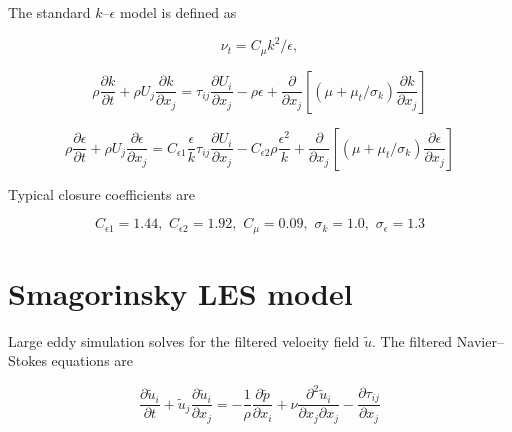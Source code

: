 The standard $k$--$\epsilon$ model is defined as \cite{Wilcox1993}

\begin{equation}
    \nu_t = C_\mu k^2 / \epsilon,
    \label{eq:kepsilon-nut}
\end{equation}

\begin{equation}
    \rho \frac{\partial k}{\partial t}
    + \rho U_j \frac{\partial k}{\partial x_j}
    = \tau_{ij} \frac{\partial U_i}{\partial x_j}
    - \rho \epsilon
    + \frac{\partial}{\partial x_j}
    \left[
    (\mu + \mu_t/\sigma_k) \frac{\partial k}{\partial x_j}
    \right]
    \label{eq:kepsilon-k}
\end{equation}

\begin{equation}
    \rho \frac{\partial \epsilon}{\partial t}
    + \rho U_j \frac{\partial \epsilon}{\partial x_j}
    = C_{\epsilon 1} \frac{\epsilon}{k} \tau_{ij}
    \frac{\partial U_i}{\partial x_j}
    - C_{\epsilon 2} \rho \frac{\epsilon^2}{k}
    + \frac{\partial}{\partial x_j}
    \left[
    (\mu + \mu_t/\sigma_k) \frac{\partial \epsilon}{\partial x_j}
    \right]
    \label{eq:kepsilon-epsilon}
\end{equation}

Typical closure coefficients are

\begin{equation}
    C_{\epsilon 1} = 1.44, \, \,
    C_{\epsilon 2} = 1.92, \, \,
    C_\mu = 0.09, \, \,
    \sigma_k = 1.0, \, \,
    \sigma_\epsilon = 1.3
\end{equation}


\section{Smagorinsky LES model}

Large eddy simulation solves for the filtered velocity field $\tilde{u}$. The
filtered Navier--Stokes equations are

\begin{equation}
    \frac{\partial \tilde{u}_i}{\partial t}
    + \tilde{u}_j \frac{\partial \tilde{u}_i}{\partial x_j}
    = - \frac{1}{\rho} \frac{\partial \tilde{p}}{\partial x_i}
    + \nu \frac{\partial^2 \tilde{u}_i}{\partial x_j \partial x_j}
    - \frac{\partial \tau_{ij}}{\partial x_j}
    \label{eq:filtered-ns}
\end{equation}

